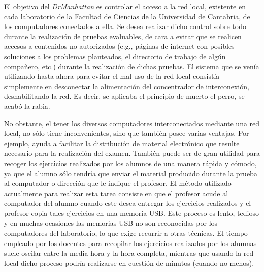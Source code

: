 El objetivo del \emph{DrManhattan} es controlar el acceso a la red local, existente en cada laboratorio de la Facultad de Ciencias de la Universidad de Cantabria, de los computadores conectados a ella.
%
Se desea realizar dicho control sobre todo durante la realización de pruebas evaluables, de cara a evitar que se realicen accesos a contenidos no autorizados (e.g., páginas de internet con posibles soluciones a los problemas planteados, el directorio de trabajo de algún compañero, etc.) durante la realización de dichas pruebas. El sistema que se venía utilizando hasta ahora para evitar el mal uso de la red local consistía simplemente en desconectar la alimentación del concentrador de interconexión, deshabilitando la red. Es decir, se aplicaba el principio de muerto el perro, se acabó la rabia.

No obstante, el tener los diversos computadores interconectados mediante una red local, no sólo tiene inconvenientes, sino que también posee varias ventajas. Por ejemplo, ayuda a facilitar la distribución de material electrónico que resulte necesario para la realización del examen. También puede ser de gran utilidad para recoger los ejercicios realizados por los alumnos de una manera rápida y cómodo, ya que el alumno sólo tendría que enviar el material producido durante la prueba al computador o dirección que le indique el profesor. El método utilizado actualmente para realizar esta tarea consiste en que el profesor acude al computador del alumno cuando este desea entregar los ejercicios realizados y el profesor copia tales ejercicios en una memoria USB. Este proceso es lento, tedioso y en muchas ocasiones las memorias USB no son reconocidas por los computadores del laboratorio, lo que exige recurrir a otras técnicas. El tiempo empleado por los docentes para recopilar los ejercicios realizados por los alumnas suele oscilar entre la media hora y la hora completa, mientras que usando la red local dicho proceso podría realizarse en cuestión de minutos (cuando no menos).

